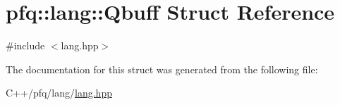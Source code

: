 \hypertarget{structpfq_1_1lang_1_1Qbuff}{}\section{pfq\+:\+:lang\+:\+:Qbuff Struct Reference}
\label{structpfq_1_1lang_1_1Qbuff}


{\ttfamily \#include $<$lang.\+hpp$>$}



The documentation for this struct was generated from the following file\+:\begin{DoxyCompactItemize}
\item 
C++/pfq/lang/\hyperlink{lang_8hpp}{lang.\+hpp}\end{DoxyCompactItemize}
